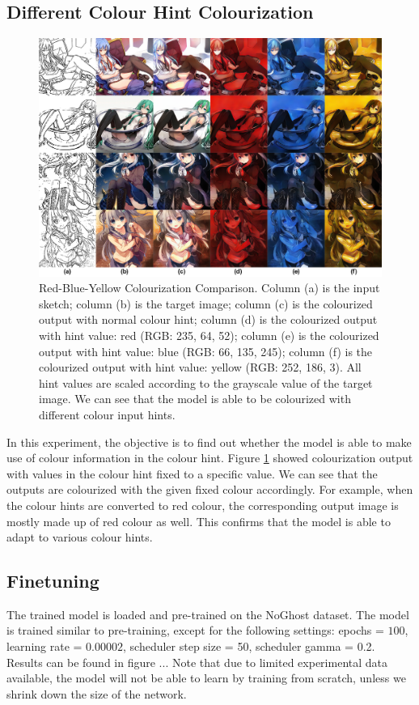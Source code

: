 \subsection{Different Colour Hint Colourization}
\begin{figure}
    \centering
    \includegraphics[width=1.0\textwidth]{images/colorization/RYB_comparison.png}
    \caption{Red-Blue-Yellow Colourization Comparison. Column (a) is the input sketch; column (b) is the target image; column (c) is the colourized output with normal colour hint; column (d) is the colourized output with hint value: red (RGB: 235, 64, 52); column (e) is the colourized output with hint value: blue (RGB: 66, 135, 245); column (f) is the colourized output with hint value: yellow (RGB: 252, 186, 3). All hint values are scaled according to the grayscale value of the target image. We can see that the model is able to be colourized with different colour input hints.}
    \label{fig:ryb_comparison}
\end{figure}
In this experiment, the objective is to find out whether the model is able to make use of colour information in the colour hint. Figure \ref{fig:ryb_comparison} showed colourization output with values in the colour hint fixed to a specific value. We can see that the outputs are colourized with the given fixed colour accordingly. For example, when the colour hints are converted to red colour, the corresponding output image is mostly made up of red colour as well. This confirms that the model is able to adapt to various colour hints.

\subsection{Finetuning}
The trained model is loaded and pre-trained on the NoGhost dataset. The model is trained similar to pre-training, except for the following settings: epochs = $100$, learning rate = $0.00002$, scheduler step size = 50, scheduler gamma = 0.2. Results can be found in figure ... Note that due to limited experimental data available, the model will not be able to learn by training from scratch, unless we shrink down the size of the network.


